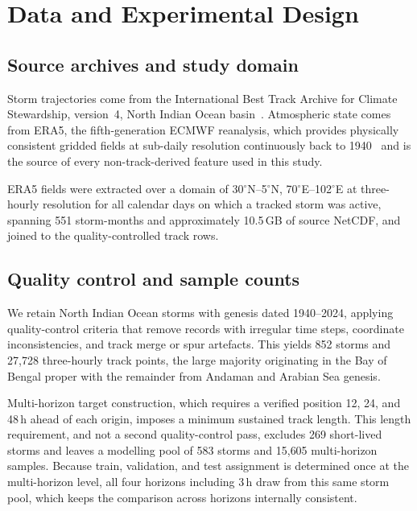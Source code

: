\documentclass[10pt,twocolumn,a4paper]{article}
\newcommand{\bob}{Bay of Bengal}
\newcommand{\era}{ERA5}
\begin{document}
\section{Data and Experimental Design}
\label{sec:data}
\subsection{Source archives and study domain}
Storm trajectories come from the International Best Track Archive for Climate
Stewardship, version~4, North Indian Ocean
basin~\cite{knapp2010ibtracs,gahtan2024ibtracs}. Atmospheric state comes from
\era{}, the fifth-generation ECMWF reanalysis, which provides physically
consistent gridded fields at sub-daily resolution continuously back to
1940~\cite{hersbach2023era5} and is the source of every non-track-derived
feature used in this study.

\era{} fields were extracted over a domain of 30$^\circ$N--5$^\circ$N,
70$^\circ$E--102$^\circ$E at three-hourly resolution for all calendar days on
which a tracked storm was active, spanning 551 storm-months and approximately
10.5\,GB of source NetCDF, and joined to the quality-controlled track rows.

\subsection{Quality control and sample counts}
We retain North Indian Ocean storms with genesis dated 1940--2024, applying
quality-control criteria that remove records with irregular time steps,
coordinate inconsistencies, and track merge or spur artefacts. This yields 852
storms and 27{,}728 three-hourly track points, the large majority originating in
the \bob{} proper with the remainder from Andaman and Arabian Sea genesis.

Multi-horizon target construction, which requires a verified position 12, 24, and
48\,h ahead of each origin, imposes a minimum sustained track length. This length
requirement, and not a second quality-control pass, excludes 269 short-lived
storms and leaves a modelling pool of 583 storms and 15{,}605 multi-horizon
samples. Because train, validation, and test assignment is determined once at the
multi-horizon level, all four horizons including 3\,h draw from this same storm
pool, which keeps the comparison across horizons internally consistent.
\end{document}
